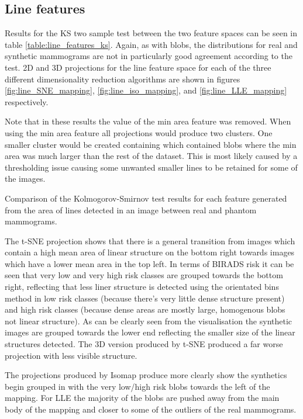 \subsection{Line features}
Results for the KS two sample test between the two feature spaces can be seen in table \ref{table:line_features_ks}. Again, as with blobs, the distributions for real and synthetic mammograms are not in particularly good agreement according to the test. 2D and 3D projections for the line feature space for each of the three different dimensionality reduction algorithms are shown in figures \ref{fig:line_SNE_mapping}, \ref{fig:line_iso_mapping}, and \ref{fig:line_LLE_mapping} respectively.
 
Note that in these results the value of the min area feature was removed. When using the min area feature all projections would produce two clusters. One smaller cluster would be created containing which contained blobs where the min area was much larger than the rest of the dataset. This is most likely caused by a thresholding issue causing some unwanted smaller lines to be retained for some of the images.

\begin{table}[H]
\label{table:line_features_ks}
\centering
{}
\caption{Comparison of the Kolmogorov-Smirnov test results for each feature generated from the area of lines detected in an image between real and phantom mammograms.}
\end{table}

The t-SNE projection shows that there is a general transition from images which contain a high mean area of linear structure on the bottom right towards images which have a lower mean area in the top left. In terms of BIRADS risk it can be seen that very low and very high risk classes are grouped towards the bottom right, reflecting that less liner structure is detected using the orientated bins method in low risk classes (because there's very little dense structure present) and high risk classes (because dense areas are mostly large, homogenous blobs not linear structure). As can be clearly seen from the visualisation the synthetic images are grouped towards the lower end reflecting the smaller size of the linear structures detected. The 3D version produced by t-SNE produced a far worse projection with less visible structure.

The projections produced by Isomap produce more clearly show the synthetics begin grouped in with the very low/high risk blobs towards the left of the mapping. For LLE the majority of the blobs are pushed away from the main body of the mapping and closer to some of the outliers of the real mammograms.

